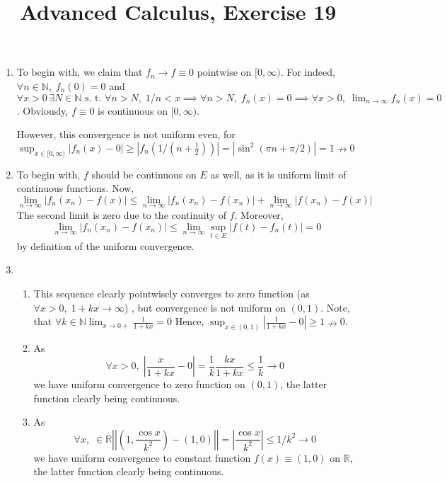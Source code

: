 \documentclass[8pt]{article} %
\title{Advanced Calculus, Exercise 19}
\newcommand{\mynorm}[1]{\left|\left|#1\right|\right|}
\newcommand{\myabs}[1]{\left|#1\right|}
\begin{document}
\maketitle
\begin{enumerate}
	\item{To begin with, we claim that $f_n\to f\equiv0$ pointwise on $[0,\infty)$. For indeed, $\forall n\in\mathbb{N},\; f_n(0)=0$ and  $\forall x>0\,\exists N\in\mathbb{N}
		\text{ s. t. }\forall n>N,\; 1/n<x\implies \forall n>N,\;f_n(x)=0\implies \forall x>0,\; \displaystyle\lim_{n\to\infty}f_n(x)=0$. Obviously, $f\equiv0$ is 
		continuous on $[0,\infty)$.

		However, this convergence is not uniform even, for $\displaystyle\sup_{x\in [0,\infty)}\myabs{f_n(x)-0}\geq \myabs{f_n(1/(n+\frac{1}{2}))}=\myabs{\sin^2(\pi n+\pi/2)}=1
		\nrightarrow 0$
		}
	\item{To begin with, $f$ should be continuous on $E$ as well, as it is uniform limit of continuous functions. Now,
		\[\lim_{n\to\infty}\myabs{f_n(x_n)-f(x)}\leq\lim_{n\to\infty}\myabs{f_n(x_n)-f(x_n)}+\lim_{n\to\infty}\myabs{f(x_n)-f(x)}\]
		The second limit is zero due to the continuity of $f$. Moreover,
		\[\lim_{n\to\infty}\myabs{f_n(x_n)-f(x_n)}\leq \lim_{n\to\infty}\sup_{t\in E}\myabs{f(t)-f_n(t)}=0\]
		by definition of the uniform convergence.
		}
	\item{\begin{enumerate}[label=(\alph*)]
			\item{This sequence clearly pointwisely converges to zero function (as $\forall x>0,\;1+kx\to\infty$)
				, but convergence is not uniform on $(0,1)$. Note, that $\forall k\in\mathbb{N}
				\displaystyle\lim_{x\to 0+}\frac{1}{1+kx}=0$ Hence, $\displaystyle\sup_{x\in (0,1)}\myabs{\frac{1}{1+kx}-0}\geq 1\nrightarrow 0$.
				}
			\item{As
				\[\forall x>0,\;\myabs{\frac{x}{1+kx}-0}=\frac{1}{k}\frac{kx}{1+kx}\leq \frac{1}{k}\to 0\]
				we have uniform convergence to zero function on $(0,1)$, the latter function clearly being continuous.
				}
			\item{As
				\[\forall x,\;\in\mathbb{R} \mynorm{\left(1,\frac{\cos x}{k^2}\right)-(1,0)}=\myabs{\frac{\cos x}{k^2}}\leq 1/k^2\to 0\]
				we have uniform convergence to constant function $f(x)\equiv (1,0)$ on $\mathbb{R}$, the latter function clearly being continuous.
				}
		\end{enumerate}
		}
\end{enumerate}
\end{document}
